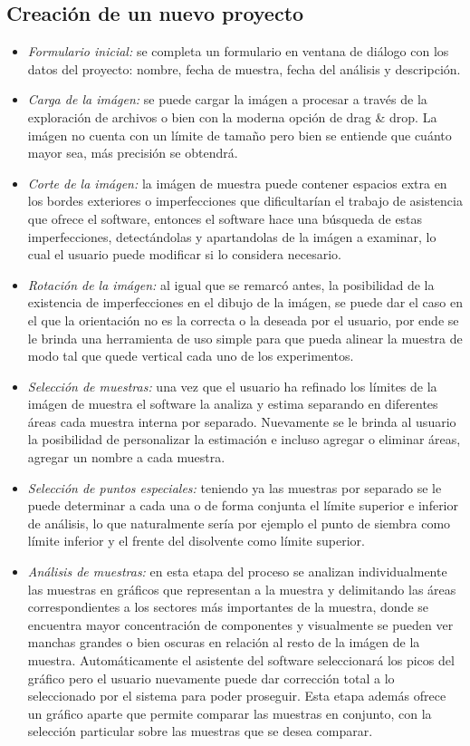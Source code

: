 \subsection{Creaci\'on de un nuevo proyecto}
\begin{itemize}
	\renewcommand{\labelitemi}{$\bullet$}
	\renewcommand{\labelitemii}{$\circ$}
	
	\item \textit{Formulario inicial:} se completa un formulario en ventana de di\'alogo con los datos del proyecto: nombre, fecha de muestra, fecha del an\'alisis y descripci\'on.
	\item \textit{Carga de la im\'agen:} se puede cargar la im\'agen a procesar a trav\'es de la exploraci\'on de archivos o bien con la moderna opci\'on de drag \& drop. La im\'agen no cuenta con un l\'imite de tama\~no pero bien se entiende que cu\'anto mayor sea, m\'as precisi\'on se obtendr\'a.
	\item \textit{Corte de la im\'agen:} la im\'agen de muestra puede contener espacios extra en los bordes exteriores o imperfecciones que dificultar\'ian el trabajo de asistencia que ofrece el software, entonces el software hace una b\'usqueda de estas imperfecciones, detect\'andolas y apartandolas de la im\'agen a examinar, lo cual el usuario puede modificar si lo considera necesario.
	\item \textit{Rotaci\'on de la im\'agen:} al igual que se remarc\'o antes, la posibilidad de la existencia de imperfecciones en el dibujo de la im\'agen, se puede dar el caso en el que la orientaci\'on no es la correcta o la deseada por el usuario, por ende se le brinda una herramienta de uso simple para que pueda alinear la muestra de modo tal que quede vertical cada uno de los experimentos.
	\item \textit{Selecci\'on de muestras:} una vez que el usuario ha refinado los l\'imites de la im\'agen de muestra el software la analiza y estima separando en diferentes \'areas cada muestra interna por separado. Nuevamente se le brinda al usuario la posibilidad de personalizar la estimaci\'on e incluso agregar o eliminar \'areas, agregar un nombre a cada muestra.
	\item \textit{Selecci\'on de puntos especiales:} teniendo ya las muestras por separado se le puede determinar a cada una o de forma conjunta el l\'imite superior e inferior de an\'alisis, lo que naturalmente ser\'ia por ejemplo el punto de siembra como l\'imite inferior y el frente del disolvente como l\'imite superior.
	\item \textit{An\'alisis de muestras:} en esta etapa del proceso se analizan individualmente las muestras en gr\'aficos que representan a la muestra y delimitando las \'areas correspondientes a los sectores m\'as importantes de la muestra, donde se encuentra mayor concentraci\'on de componentes y visualmente se pueden ver manchas grandes o bien oscuras en relaci\'on al resto de la im\'agen de la muestra. Autom\'aticamente el asistente del software seleccionar\'a los picos del gr\'afico pero el usuario nuevamente puede dar correcci\'on total a lo seleccionado por el sistema para poder proseguir. Esta etapa adem\'as ofrece un gr\'afico aparte que permite comparar las muestras en conjunto, con la selecci\'on particular sobre las muestras que se desea comparar.

\end{itemize}
